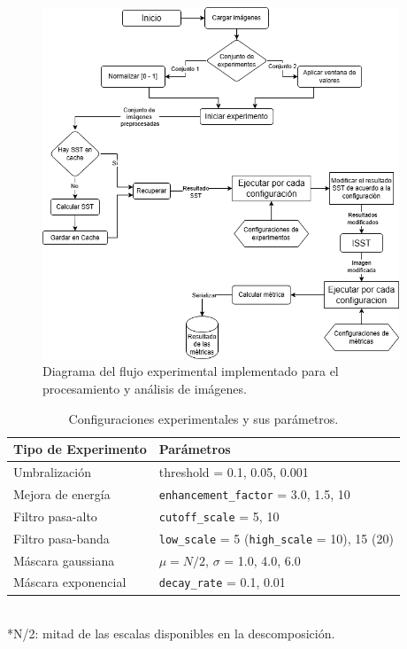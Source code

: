 \begin{figure}[H]
    \centering
    \includegraphics[width=0.95\textwidth]{Graphics/diagrama experimentos tesis.drawio.png}
    \caption{Diagrama del flujo experimental implementado para el procesamiento y análisis de imágenes.}
    \label{fig:diagrama-flujo-experimentos}
\end{figure}

\begin{table}[h]
    \centering
    \caption{Configuraciones experimentales y sus parámetros.\cite{ExperimentSource,ExperimentSource2}}
    \label{tab:experimentos}
    \begin{tabular}{>{\raggedright}p{4cm}p{6cm}}
    \toprule
    \textbf{Tipo de Experimento} & \textbf{Parámetros} \\ 
    \midrule
    Umbralización & threshold = 0.1, 0.05, 0.001 \\
    \midrule
    Mejora de energía & \texttt{enhancement\_factor} = 3.0, 1.5, 10 \\
    \midrule
    Filtro pasa-alto & \texttt{cutoff\_scale} = 5, 10 \\
    \midrule
    Filtro pasa-banda & \texttt{low\_scale} = 5 (\texttt{high\_scale} = 10), 15 (20) \\
    \midrule
    Máscara gaussiana & $ \mu  = N/2$, $ \sigma $ = 1.0, 4.0, 6.0 \\
    \midrule
    Máscara exponencial & \texttt{decay\_rate} = 0.1, 0.01 \\
    \bottomrule
    \end{tabular}
    \footnotesize{\\*N/2: mitad de las escalas disponibles en la descomposición.}
\end{table}


